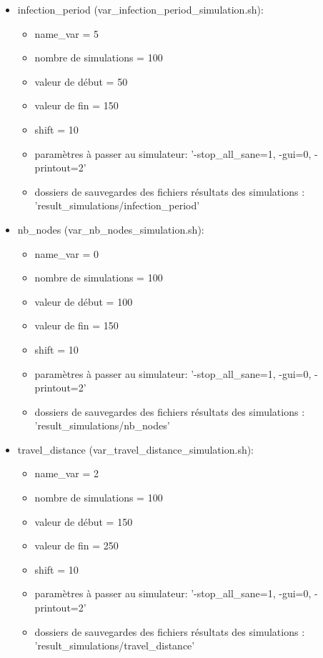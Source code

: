 \documentclass[a4paper, 11pt]{article}
\begin{document}
\begin{itemize}
				\item infection\_period (var\_infection\_period\_simulation.sh):
				\begin{itemize}
					\item name\_var = 5
					\item nombre de simulations = 100
					\item valeur de début = 50
					\item valeur de fin = 150
					\item shift = 10
					\item paramètres à passer au simulateur: '-stop\_all\_sane=1, -gui=0, -printout=2'
					\item dossiers de sauvegardes des fichiers résultats des simulations : 'result\_simulations/infection\_period'
				\end{itemize}
				
				\item nb\_nodes (var\_nb\_nodes\_simulation.sh):
				\begin{itemize}
					\item name\_var = 0
					\item nombre de simulations = 100
					\item valeur de début = 100
					\item valeur de fin = 150
					\item shift = 10
					\item paramètres à passer au simulateur: '-stop\_all\_sane=1, -gui=0, -printout=2'
					\item dossiers de sauvegardes des fichiers résultats des simulations : 'result\_simulations/nb\_nodes'
				\end{itemize}
				
				\item travel\_distance (var\_travel\_distance\_simulation.sh):
				\begin{itemize}
					\item name\_var = 2
					\item nombre de simulations = 100
					\item valeur de début = 150
					\item valeur de fin = 250
					\item shift = 10
					\item paramètres à passer au simulateur: '-stop\_all\_sane=1, -gui=0, -printout=2'
					\item dossiers de sauvegardes des fichiers résultats des simulations : 'result\_simulations/travel\_distance'
				\end{itemize}
				

\end{itemize}
\end{document}
